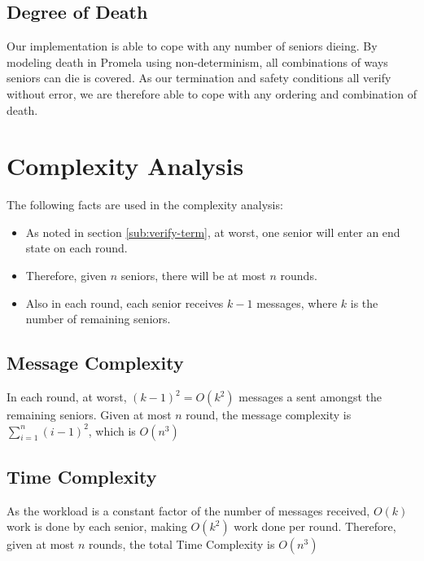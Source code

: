 \documentclass[12pt,a4paper]{scrartcl}
\begin{document}
\subsection{Degree of Death}
Our implementation is able to cope with any number of seniors dieing.
By modeling death in Promela using non-determinism, all combinations of ways seniors can die is covered.
As our termination and safety conditions all verify without error, we are therefore able to cope with any ordering and combination of death.

\section{Complexity Analysis}
The following facts are used in the complexity analysis:
\begin{itemize}
    \item As noted in section \ref{sub:verify-term}, at worst, one senior will enter an end state on each round.
    \item Therefore, given $n$ seniors, there will be at most $n$ rounds.
    \item Also in each round, each senior receives $k-1$ messages, where $k$ is the number of remaining seniors.
\end{itemize}

\subsection{Message Complexity}
In each round, at worst, $(k-1)^2 = O(k^2)$ messages a sent amongst the remaining seniors.
Given at most $n$ round, the message complexity is $\sum_{i=1}^n (i-1)^2$, which is $O(n^3)$

\subsection{Time Complexity}
As the workload is a constant factor of the number of messages received, $O(k)$ work is done by each senior, making $O(k^2)$ work done per round.
Therefore, given at most $n$ rounds, the total Time Complexity is $O(n^3)$
\end{document}
